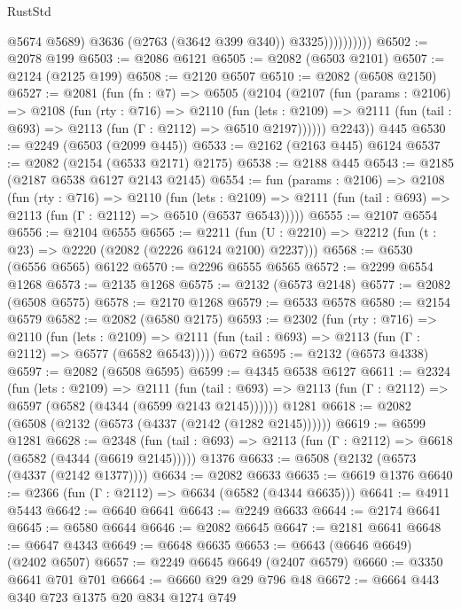 \begin{lexlean}{RustStd}
\begin{coremodule}
                          @5674
                          @5689)
                        @3636
                        (@2763 (@3642 @399 @340))
                        @3325))))))))))
@6502 := @2078 @199
@6503 := @2086 @6121
@6505 := @2082 (@6503 @2101)
@6507 := @2124 (@2125 @199)
@6508 := @2120 @6507
@6510 := @2082 (@6508 @2150)
@6527 := @2081
    (fun (fn : @7) =>
    @6505
      (@2104
        (@2107
          (fun (params : @2106) =>
          @2108
            (fun (rty : @716) =>
            @2110
              (fun (lets : @2109) =>
              @2111 (fun (tail : @693) => @2113 (fun (Γ : @2112) => @6510 @2197))))))
        @2243))
    @445
@6530 := @2249 (@6503 (@2099 @445))
@6533 := @2162 (@2163 @445) @6124
@6537 := @2082 (@2154 (@6533 @2171) @2175)
@6538 := @2188 @445
@6543 := @2185 (@2187 @6538 @6127 @2143 @2145)
@6554 := fun (params : @2106) =>
  @2108
    (fun (rty : @716) =>
    @2110
      (fun (lets : @2109) =>
      @2111 (fun (tail : @693) => @2113 (fun (Γ : @2112) => @6510 (@6537 @6543)))))
@6555 := @2107 @6554
@6556 := @2104 @6555
@6565 := @2211 (fun (U : @2210) => @2212 (fun (t : @23) => @2220 (@2082 (@2226 @6124 @2100) @2237)))
@6568 := @6530 (@6556 @6565) @6122
@6570 := @2296 @6555 @6565
@6572 := @2299 @6554 @1268
@6573 := @2135 @1268
@6575 := @2132 (@6573 @2148)
@6577 := @2082 (@6508 @6575)
@6578 := @2170 @1268
@6579 := @6533 @6578
@6580 := @2154 @6579
@6582 := @2082 (@6580 @2175)
@6593 := @2302
    (fun (rty : @716) =>
    @2110
      (fun (lets : @2109) =>
      @2111 (fun (tail : @693) => @2113 (fun (Γ : @2112) => @6577 (@6582 @6543)))))
    @672
@6595 := @2132 (@6573 @4338)
@6597 := @2082 (@6508 @6595)
@6599 := @4345 @6538 @6127
@6611 := @2324
    (fun (lets : @2109) =>
    @2111
      (fun (tail : @693) => @2113 (fun (Γ : @2112) => @6597 (@6582 (@4344 (@6599 @2143 @2145))))))
    @1281
@6618 := @2082 (@6508 (@2132 (@6573 (@4337 (@2142 (@1282 @2145))))))
@6619 := @6599 @1281
@6628 := @2348
    (fun (tail : @693) => @2113 (fun (Γ : @2112) => @6618 (@6582 (@4344 (@6619 @2145)))))
    @1376
@6633 := @6508 (@2132 (@6573 (@4337 (@2142 @1377))))
@6634 := @2082 @6633
@6635 := @6619 @1376
@6640 := @2366 (fun (Γ : @2112) => @6634 (@6582 (@4344 @6635)))
@6641 := @4911 @5443
@6642 := @6640 @6641
@6643 := @2249 @6633
@6644 := @2174 @6641
@6645 := @6580 @6644
@6646 := @2082 @6645
@6647 := @2181 @6641
@6648 := @6647 @4343
@6649 := @6648 @6635
@6653 := @6643 (@6646 @6649) (@2402 @6507)
@6657 := @2249 @6645 @6649 (@2407 @6579)
@6660 := @3350 @6641 @701 @701
@6664 := @6660 @29 @29 @796 @48
@6672 := @6664 @443 @340 @723 @1375 @20 @834 @1274 @749

\end{coremodule}
\end{lexlean}
